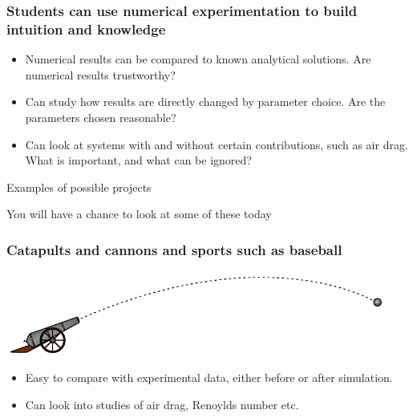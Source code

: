 \documentclass[english, 12pt]{beamer}
\begin{document}
\begin{frame}[fragile]
\frametitle{Students can use numerical experimentation to build intuition and knowledge}

\begin{itemize}
	\item Numerical results can be compared to known analytical solutions. Are numerical results trustworthy?
	\item Can study how results are directly changed by parameter choice. Are the parameters chosen reasonable?
	\item Can look at systems with and without certain contributions, such as air drag. \\ What is important, and what can be ignored?
\end{itemize}
\end{frame}

\begin{frame}
\begin{center}
{\Huge \color{DarkFern} Examples of possible projects}

You will have a chance to look at some of these today
\end{center}
\end{frame}

\begin{frame}[fragile]
\frametitle{Catapults and cannons and sports such as baseball}

\begin{center}
\includegraphics[width=\textwidth]{cannonball}
\end{center}

\vspace{0.5cm}

\begin{itemize}
	\item Easy to compare with experimental data, either before or after simulation.
	\item Can look into studies of air drag, Renoylds number etc.
\end{itemize}
\end{frame}
\end{document}
